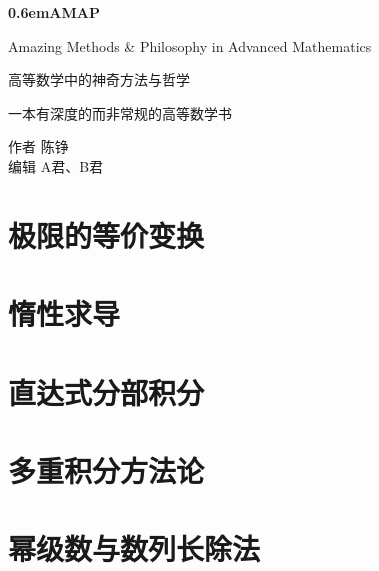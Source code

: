 \documentclass{ctexbook}
\begin{document}
\clearpage
\newcommand\nbvspace[1][3]{\vspace*{\stretch{#1}}}
\newcommand\nbstretchyspace{\spaceskip0.5em plus 0.25em minus 0.25em}
\newcommand{\nbtitlestretch}{\spaceskip0.6em}
\pagestyle{empty}
\begin{center}
\bfseries
\nbvspace[1]
\Huge
{\nbtitlestretch\huge AMAP}

\nbvspace[1]
\normalsize

Amazing Methods \& Philosophy in Advanced Mathematics

\Large 高等数学中的神奇方法与哲学

\nbvspace[2]

\normalsize 一本有深度的而非常规的高等数学书

\nbvspace[1]
\small 作者 \Large 陈铮\\[0.5em]
\footnotesize 编辑 A君、B君
\normalsize


\end{center}

\tableofcontents

\chapter{极限的等价变换}

\chapter{惰性求导}

\chapter{直达式分部积分}

\chapter{多重积分方法论}

\chapter{幂级数与数列长除法}
\end{document}
